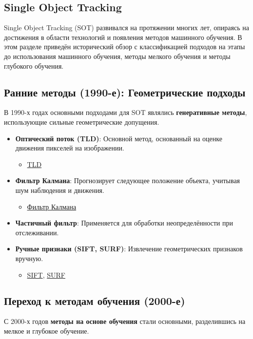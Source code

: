\thispagestyle{empty}
\subsection{Single Object Tracking}

Single Object Tracking (SOT) развивался на протяжении многих лет, опираясь на достижения в области технологий и появления методов машинного обучения. В этом разделе приведён исторический обзор с классификацией подходов на этапы до использования машинного обучения, методы мелкого обучения и методы глубокого обучения.

\subsection{Ранние методы (1990-е): Геометрические подходы}
В 1990-х годах основными подходами для SOT являлись \textbf{генеративные методы}, использующие сильные геометрические допущения.

\begin{itemize}
    \item \textbf{Оптический поток (TLD)}: Основной метод, основанный на оценке движения пикселей на изображении.
    \begin{itemize}
        \item \href{http://vision.deis.unibo.it/ssalti/papers/Salti-TIP12.pdf}{TLD}
    \end{itemize}
    \item \textbf{Фильтр Калмана}: Прогнозирует следующее положение объекта, учитывая шум наблюдения и движения.
    \begin{itemize}
        \item \href{https://www.sciencedirect.com/science/article/pii/S1534580701000363}{Фильтр Калмана}
    \end{itemize}
    \item \textbf{Частичный фильтр}: Применяется для обработки неопределённости при отслеживании.
    \item \textbf{Ручные признаки (SIFT, SURF)}: Извлечение геометрических признаков вручную.
    \begin{itemize}
        \item \href{https://www.cs.ubc.ca/~lowe/papers/ijcv04.pdf}{SIFT}, \href{https://www.vision.ee.ethz.ch/en/publications/papers/articles/eth_biwi_00378.pdf}{SURF}
    \end{itemize}
\end{itemize}

\subsection*{Переход к методам обучения (2000-е)}
С 2000-х годов \textbf{методы на основе обучения} стали основными, разделившись на мелкое и глубокое обучение.

